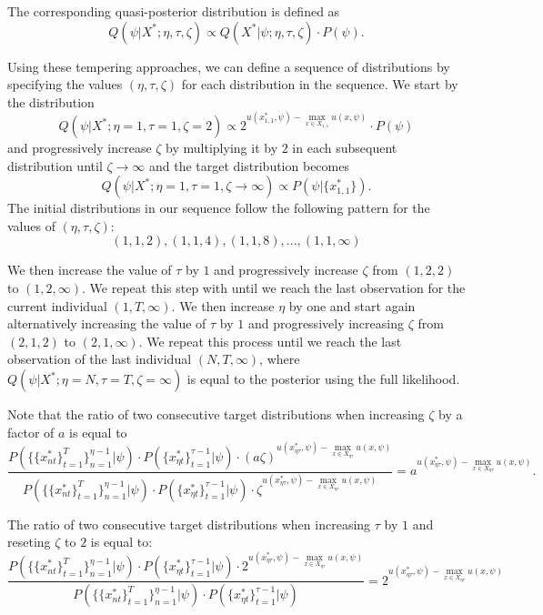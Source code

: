 \documentclass[12pt]{article}
\begin{document}
The corresponding quasi-posterior distribution is defined as
$$ Q(\psi|X^*;\eta,\tau,\zeta) \propto Q(X^*|\psi;\eta,\tau,\zeta) \cdot P(\psi) .$$

Using these tempering approaches, we can define a sequence of distributions by specifying the values $(\eta,\tau,\zeta)$ for each distribution in the sequence. We start by the distribution 
$$Q(\psi|X^*;\eta=1,\tau=1,\zeta=2) \propto 2^{ u(x_{1,1}^*,\psi) - \max_{x \in X_{1,1}} u(x,\psi)} \cdot P(\psi)$$ 
and progressively increase $\zeta$ by multiplying it by $2$ in each subsequent distribution until $\zeta \to \infty$ and the target distribution becomes
$$ Q(\psi|X^*;\eta=1,\tau=1,\zeta \to \infty) \propto  P(\psi|\{x_{1,1}^*\}).$$
The initial distributions in our sequence follow the following pattern for the values of $(\eta,\tau,\zeta)$:
$$(1,1,2),(1,1,4),(1,1,8),...,(1,1,\infty) $$

We then increase the value of $\tau$ by $1$ and progressively increase $\zeta$ from $(1,2,2)$ to $(1,2,\infty)$. We repeat this step with until we reach the last observation for the current individual $(1,T,\infty)$. We then increase $\eta$ by one and start again alternatively increasing the value of $\tau$ by $1$ and progressively increasing $\zeta$ from $(2,1,2)$ to $(2,1,\infty)$. We repeat this process until we reach the last observation of the last individual $(N,T,\infty)$, where $Q(\psi|X^*;\eta=N,\tau=T,\zeta=\infty)$ is equal to the posterior using the full likelihood.

Note that the ratio of two consecutive target distributions when increasing $\zeta$ by a factor of $a$ is equal to
$$ \frac{P(\{\{x_{nt}^*\}_{t=1}^T\}_{n=1}^{\eta-1}|\psi) \cdot  P(\{x_{\eta t}^*\}_{t=1}^{\tau-1}|\psi) \cdot (a \zeta)^{ u(x_{\eta \tau}^*,\psi) - \max_{x \in X_{\eta \tau}} u(x,\psi)}}{P(\{\{x_{nt}^*\}_{t=1}^T\}_{n=1}^{\eta-1}|\psi) \cdot  P(\{x_{\eta t}^*\}_{t=1}^{\tau-1}|\psi) \cdot \zeta^{ u(x_{\eta \tau}^*,\psi) - \max_{x \in X_{\eta \tau}} u(x,\psi)}} = a^{ u(x_{\eta \tau}^*,\psi) - \max_{x \in X_{\eta \tau}} u(x,\psi)}.$$

The ratio of two consecutive target distributions when increasing $\tau$ by $1$ and reseting $\zeta$ to $2$ is equal to:
$$ \frac{  P(\{\{x_{nt}^*\}_{t=1}^T\}_{n=1}^{\eta-1}|\psi) \cdot  P(\{x_{\eta t}^*\}_{t=1}^{\tau-1}|\psi) \cdot 2^{ u(x_{\eta \tau}^*,\psi) - \max_{x \in X_{\eta \tau}} u(x,\psi)}}{P(\{\{x_{nt}^*\}_{t=1}^T\}_{n=1}^{\eta-1}|\psi) \cdot  P(\{x_{\eta t}^*\}_{t=1}^{\tau-1}|\psi)} = 2^{ u(x_{\eta \tau}^*,\psi) - \max_{x \in X_{\eta \tau}} u(x,\psi)} $$
\end{document}
